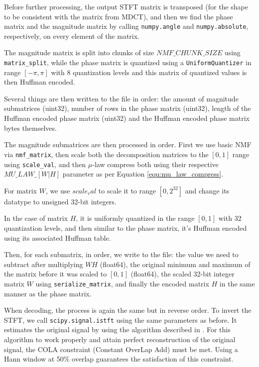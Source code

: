 Before further processing, the output STFT matrix is transposed (for the shape to be consistent with the matrix from MDCT), and then we find the phase matrix and the magnitude matrix by calling \verb|numpy.angle| and \verb|numpy.absolute|, respectively, on every element of the matrix.

The magnitude matrix is split into chunks of size $NMF\_CHUNK\_SIZE$ using \verb|matrix_split|, while the phase matrix is quantized using a \verb|UniformQuantizer| in range $[-\pi, \pi]$ with 8 quantization levels and this matrix of quantized values is then Huffman encoded.

Several things are then written to the file in order: the amount of magnitude submatrices (uint32), number of rows in the phase matrix (uint32), length of the Huffman encoded phase matrix (uint32) and the Huffman encoded phase matrix bytes themselves.

The magnitude submatrices are then processed in order. First we use basic NMF via \verb|nmf_matrix|, then scale both the decomposition matrices to the $[0, 1]$ range using \verb|scale_val|, and then $\mu$-law compress both using their respective $MU\_LAW\_[W|H]$ parameter as per Equation \ref{equ:mu_law_compress}.

For matrix $W$, we use $scale_val$ to scale it to range $[0, 2^{32}]$ and change its datatype to unsigned 32-bit integers.

In the case of matrix $H$, it is uniformly quantized in the range $[0, 1]$ with 32 quantization levels, and then similar to the phase matrix, it's Huffman encoded using its associated Huffman table.

Then, for each submatrix, in order, we write to the file: the value we need to subtract after multiplying $WH$ (float64), the original minimum and maximum of the matrix before it was scaled to $[0, 1]$ (float64), the scaled 32-bit integer matrix $W$ using \verb|serialize_matrix|, and finally the encoded matrix $H$ in the same manner as the phase matrix.

When decoding, the process is again the same but in reverse order. To invert the STFT, we call \verb|scipy.signal.istft| using the same parameters as before. It estimates the original signal by using the algorithm described in \cite{griffin_1984}. For this algorithm to work properly and attain perfect reconstruction of the original signal, the COLA constraint (Constant OverLap Add) \cite{bors_2012} must be met. Using a Hann window at 50\% overlap guarantees the satisfaction of this constraint.
